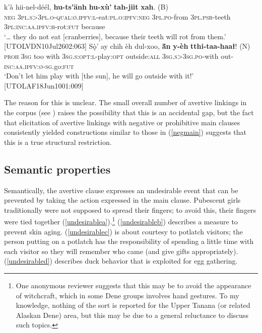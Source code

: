 \documentclass[output=paper,colorlinks,citecolor=brown]{langscibook}
\begin{document}
\begin{exe}
\ex \label{negmain}
\begin{xlista}
\ex\label{negmaina}
\gll  {\ldots} k'à hii-nel-déél, \textbf{hu-ts'änh} \textbf{hu-xù'} \textbf{tah-jiit} {\textbf{xah}. \textnormal{(B)}}\\
{} \textsc{neg} \textsc{3pl.s>3pl.o-qual:ø.ipfv:l}-eat:\textsc{pl.o:ipfv:neg} \textsc{3pl.po}-from \textsc{3pl.psr}-teeth \textsc{3pl:inc:aa.ipfv:h}-rot:\textsc{fut} because \\
\glt `{\ldots} they do not eat [cranberries], because their teeth will rot from them.' \hfill [UTOLVDN10Jul2602:063]
\ex\label{negmainb}
\gll Sǫ̀' ay chih èh dul-xoo, \textbf{ä́n} \textbf{y-èh} {\textbf{tthi-taa-haał}! \textnormal{(N)}} \\
\textsc{proh} \textsc{3sg} too with \textsc{3sg.s:opt:l}-play:\textsc{opt} outside:\textsc{all} \textsc{3sg.s>3sg.po}-with out-\textsc{inc:aa.ipfv:ø-sg}.go:\textsc{fut}\\
\glt `Don't let him play with [the sun], he will go outside with it!' \\ \hfill [UTOLAF18Jun1001:009]
\end{xlista}
\end{exe}

The reason for this is unclear. The small overall number of avertive linkings in the corpus (see ) raises the possibility that this is an accidental gap, but the fact that elicitation of avertive linkings with negative or prohibitive main clauses consistently yielded constructions similar to those in (\ref{negmain}) suggests that this is a true structural restriction.


\subsection{Semantic properties}
\label{subsection:avertive-semantics}

Semantically, the avertive clause expresses an undesirable event that can be prevented by taking the action expressed in the main clause. Pubescent girls traditionally were not supposed to spread their fingers; to avoid this, their fingers were tied together (\ref{undesirablea}).\footnote{One anonymous reviewer suggests that this may be to avoid the appearance of witchcraft, which in some Dene groups involves hand gestures. To my knowledge, nothing of the sort is reported for the Upper Tanana (or related Alaskan Dene) area, but this may be due to a general reluctance to discuss such topics.} (\ref{undesirableb}) describes a measure to prevent skin aging. (\ref{undesirablec}) is about courtesy to potlatch visitors; the person putting on a potlatch has the responsibility of spending a little time with each visitor so they will remember who came (and give gifts appropriately). (\ref{undesirabled}) describes duck behavior that is exploited for egg gathering.
\end{document}
